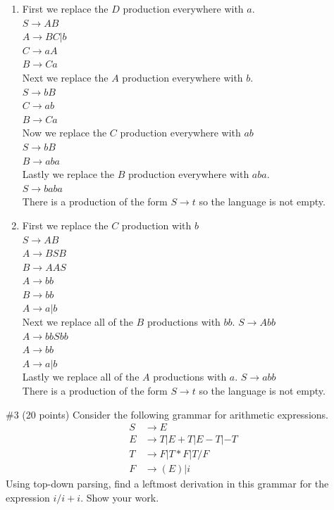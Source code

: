 \begin{solution}
    \begin{enumerate}
        \item First we replace the $D$ production everywhere with $a$.\\
        $S \to AB$\\
        $A \to BC | b$\\
        $C \to aA$\\
        $B \to Ca$\\
        Next we replace the $A$ production everywhere with $b$.\\
        $S \to bB$\\
        $C \to ab$\\
        $B \to Ca$\\
        Now we replace the $C$ production everywhere with $ab$\\
        $S \to bB$\\
        $B \to aba$\\
        Lastly we replace the $B$ production everywhere with $aba$.\\
        $S \to baba$\\
        There is a production of the form $S \to t$ so the language is not empty.
        \item First we replace the $C$ production with $b$\\
        $S \to AB$\\
        $A \to BSB$\\
        $B \to AAS$\\
        $A \to bb$\\
        $B \to bb$\\
        $A \to a|b$\\
        Next we replace all of the $B$ productions with $bb$.
        $S \to Abb$\\
        $A \to bbSbb$\\
        $A \to bb$\\
        $A \to a|b$\\
        Lastly we replace all of the $A$ productions with $a$.
        $S \to abb$\\
        There is a production of the form $S \to t$ so the language is not empty.
    \end{enumerate}
\end{solution}

\begin{problem}{\#3 (20 points)}
    Consider the following grammar for arithmetic expressions.
    \begin{align*}
        S &\to E\\
        E &\to T | E+T | E-T | -T\\
        T &\to F | T * F | T/F\\
        F &\to \left(E\right) | i
    \end{align*}
    Using top-down parsing, find a leftmost derivation in this grammar for the expression $i/i+i$. Show your work.
\end{problem}
\begin{solution}
\end{solution}

